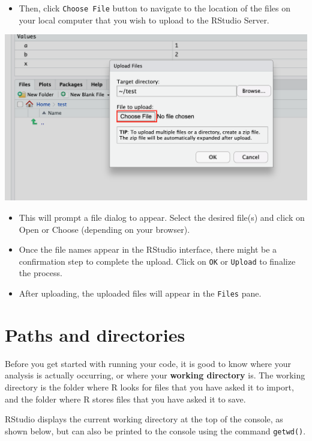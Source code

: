 \documentclass[
]{book}
\providecommand{\tightlist}{%
  \setlength{\itemsep}{0pt}\setlength{\parskip}{0pt}}
\begin{document}
\begin{itemize}
\tightlist
\item
  Then, click \texttt{Choose\ File} button to navigate to the location of the files on your local computer that you wish to upload to the RStudio Server.
\end{itemize}

\includegraphics{images/upload_rstudio2.png}

\begin{itemize}
\item
  This will prompt a file dialog to appear. Select the desired file(s) and click on Open or Choose (depending on your browser).
\item
  Once the file names appear in the RStudio interface, there might be a confirmation step to complete the upload. Click on \texttt{OK} or \texttt{Upload} to finalize the process.
\item
  After uploading, the uploaded files will appear in the \texttt{Files} pane.
\end{itemize}

\hypertarget{paths-and-directories}{%
\section{Paths and directories}\label{paths-and-directories}}

Before you get started with running your code, it is good to know where your analysis is actually occurring, or where your \textbf{working directory} is. The working directory is the folder where R looks for files that you have asked it to import, and the folder where R stores files that you have asked it to save.

RStudio displays the current working directory at the top of the console, as shown below, but can also be printed to the console using the command \texttt{getwd()}.
\end{document}
